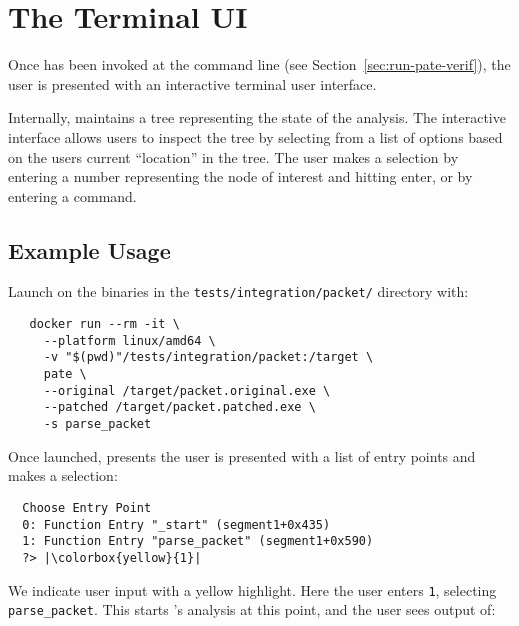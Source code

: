 \section{The \pate{} Terminal UI}
\label{sec:terminal-ui}

Once \pate{} has been invoked at the command line (see Section~\ref{sec:run-pate-verif}), the user is presented with an interactive terminal user interface.

Internally, \pate{} maintains a tree representing the state of the analysis.
The interactive interface allows users to inspect the tree by selecting from a list of options based on the users current ``location'' in the tree.
The user makes a selection by entering a number representing the node of interest and hitting enter, or by entering a command.

\subsection{Example Usage}

Launch \pate{} on the binaries in the \texttt{tests/integration/packet/} directory with:

\begin{verbatim}
   docker run --rm -it \
     --platform linux/amd64 \
     -v "$(pwd)"/tests/integration/packet:/target \
     pate \
     --original /target/packet.original.exe \
     --patched /target/packet.patched.exe \
     -s parse_packet
 \end{verbatim}

Once launched, \pate{} presents the user is presented with a list of entry points and makes a selection:
\begin{lstlisting}
  Choose Entry Point
  0: Function Entry "_start" (segment1+0x435)
  1: Function Entry "parse_packet" (segment1+0x590)
  ?> |\colorbox{yellow}{1}|
\end{lstlisting}

We indicate user input with a yellow highlight.
Here the user enters \texttt{1}, selecting \texttt{parse\_packet}.
This starts \pate{}'s analysis at this point, and the user sees output of:

